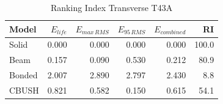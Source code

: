 \begin{table}[H]
    \centering
    \caption{Ranking Index Transverse T43A}
    \label{tab:RI_table_VerticalT43A}
    \begin{tabular}{lrrrrr}
        \toprule
        \textbf{Model}  & \textbf{$E_{life}$} & \textbf{$E_{max\, RMS}$} & \textbf{$E_{95\, RMS}$} & \textbf{$E_{combined}$} & \textbf{RI} \\
        \midrule
        Solid  & 0.000 & 0.000 & 0.000 & 0.000 & 100.0 \\
        Beam  & 0.157 & 0.090 & 0.530 & 0.212 & 80.9 \\
        Bonded  & 2.007 & 2.890 & 2.797 & 2.430 & 8.8 \\
        CBUSH  & 0.821 & 0.582 & 0.150 & 0.615 & 54.1 \\
        \bottomrule
    \end{tabular}
\end{table}
